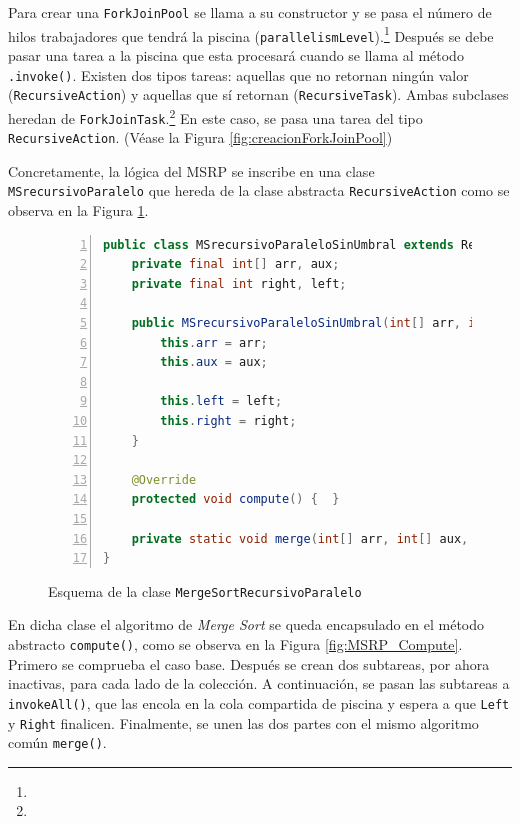 \documentclass[titlepage]{article}
\begin{document}
Para crear una \lstinline{ForkJoinPool} se llama a su constructor y se pasa el número de hilos trabajadores que tendrá la piscina (\lstinline{parallelismLevel}).\footnote[17]{} Después se debe pasar una tarea a la piscina que esta procesará cuando se llama al método \lstinline{.invoke()}. Existen dos tipos tareas: aquellas que no retornan ningún valor (\lstinline{RecursiveAction}) y aquellas que sí retornan (\lstinline{RecursiveTask}). Ambas subclases heredan de \lstinline{ForkJoinTask}.\footnote[17]{} En este caso, se pasa una tarea del tipo \lstinline{RecursiveAction}. (Véase la Figura \ref{fig:creacionForkJoinPool})

Concretamente, la lógica del MSRP se inscribe en una clase \lstinline{MSrecursivoParalelo} que hereda de la clase abstracta \lstinline{RecursiveAction} como se observa en la Figura \ref{fig:MSRP_RecursiveAction}. 

\begin{figure}[h]
	\begin{lstlisting}[language=java, frame=single, numbers=left]
public class MSrecursivoParaleloSinUmbral extends RecursiveAction {
	private final int[] arr, aux;
	private final int right, left;
	
	public MSrecursivoParaleloSinUmbral(int[] arr, int[] aux, int left, int right) {
		this.arr = arr;
		this.aux = aux;
		
		this.left = left;
		this.right = right;
	}
	
	@Override
	protected void compute() {	}
	
	private static void merge(int[] arr, int[] aux, int left, int mid, int right) {	}	
}    	
	\end{lstlisting}
	\caption{Esquema de la clase \lstinline{MergeSortRecursivoParalelo}}
	\label{fig:MSRP_RecursiveAction}
\end{figure}

En dicha clase el algoritmo de \textit{Merge Sort} se queda encapsulado en el método abstracto \lstinline{compute()}, como se observa en la Figura \ref{fig:MSRP_Compute}. Primero se comprueba el caso base. Después se crean dos subtareas, por ahora inactivas, para cada lado de la colección. A continuación, se pasan las subtareas a \lstinline{invokeAll()}, que las encola en la cola compartida de piscina y espera a que \lstinline{Left} y \lstinline{Right} finalicen. Finalmente, se unen las dos partes con el mismo algoritmo común \lstinline{merge()}.
\end{document}
